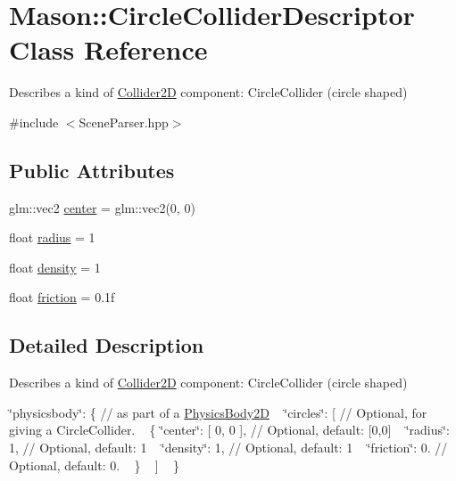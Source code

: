 \hypertarget{class_mason_1_1_circle_collider_descriptor}{}\section{Mason\+:\+:Circle\+Collider\+Descriptor Class Reference}
\label{class_mason_1_1_circle_collider_descriptor}


Describes a kind of \hyperlink{class_mason_1_1_collider2_d}{Collider2D} component\+: Circle\+Collider (circle shaped) ~\newline
  




{\ttfamily \#include $<$Scene\+Parser.\+hpp$>$}

\subsection*{Public Attributes}
\begin{DoxyCompactItemize}
\item 
glm\+::vec2 \hyperlink{class_mason_1_1_circle_collider_descriptor_a95cb9b34dd352a4fb9d13b883bebc4b6}{center} = glm\+::vec2(0, 0)
\item 
float \hyperlink{class_mason_1_1_circle_collider_descriptor_a8785a58429df1c9bac9f1f482164e9f1}{radius} = 1
\item 
float \hyperlink{class_mason_1_1_circle_collider_descriptor_a3cc660a99bd52e811faff6dfc491ff56}{density} = 1
\item 
float \hyperlink{class_mason_1_1_circle_collider_descriptor_a77cbaa2de9aa4787e94616b4a0cf5cf0}{friction} = 0.\+1f
\end{DoxyCompactItemize}


\subsection{Detailed Description}
Describes a kind of \hyperlink{class_mason_1_1_collider2_d}{Collider2D} component\+: Circle\+Collider (circle shaped) ~\newline
 

\char`\"{}physicsbody\char`\"{}\+: \{ // as part of a \hyperlink{class_mason_1_1_physics_body2_d}{Physics\+Body2D} ~\newline
 \char`\"{}circles\char`\"{}\+: \mbox{[} // Optional, for giving a Circle\+Collider. ~\newline
 \{ \char`\"{}center\char`\"{}\+: \mbox{[} 0, 0 \mbox{]}, // Optional, default\+: \mbox{[}0,0\mbox{]} ~\newline
 \char`\"{}radius\char`\"{}\+: 1, // Optional, default\+: 1 ~\newline
 \char`\"{}density\char`\"{}\+: 1, // Optional, default\+: 1 ~\newline
 \char`\"{}friction\char`\"{}\+: 0. // Optional, default\+: 0. ~\newline
 \} ~\newline
 \mbox{]} ~\newline
 \} 

